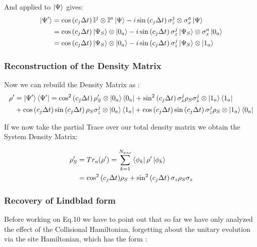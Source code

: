 \documentclass[a4paper,12pt]{article}
\begin{document}
	And applied to $ \ket{\Psi} $ gives:
	\begin{align} 
		\ket{\Psi'} &= \cos \left(c_j \Delta t \right) \mathbb{I}^j \otimes \mathbb{I}^a \ket{\Psi} - i \sin \left(c_j \Delta t \right) \sigma_{z}^{j} \otimes \sigma_{x}^{a} \ket{\Psi} \notag \\
		&= \cos \left(c_j \Delta t \right) \ket{\Psi_S} \otimes \ket{0_a} - i \sin \left(c_j \Delta t \right) \sigma_{z}^{j} \ket{\Psi_S} \otimes \sigma_{x}^{a} \ket{0_a} \notag \\
		&= \cos \left(c_j \Delta t \right) \ket{\Psi_S} \otimes \ket{0_a} - i \sin \left(c_j \Delta t \right) \sigma_{z}^{j} \ket{\Psi_S} \otimes \ket{1_a}
	\end{align}
		
	\subsubsection{Reconstruction of the Density Matrix}
	Now we can rebuild the Density Matrix as :
	\begin{align}
		\rho' &= \ket{\Psi'}\bra{\Psi'} = \cos^{2} \left(c_j \Delta t \right) \rho_S' \otimes \ket{0_a}\bra{0_a} + \sin^{2} \left(c_j \Delta t \right) \sigma_{z}^{j} \rho_S \sigma_{z}^{j} \otimes \ket{1_a}\bra{1_a} \notag \\
		&+ \cos \left(c_j \Delta t \right) \sin \left(c_j \Delta t \right) \rho_S \sigma_{z}^{j} \otimes \ket{0_a} \bra{1_a} + \cos \left(c_j \Delta t \right) \sin \left(c_j \Delta t \right) \sigma_{z}^{j} \rho_S \otimes \ket{1_a} \bra{0_a}
	\end{align}
	
	\begin{flushleft}
		If we now take the partial Trace over our total density matrix we obtain the System Density Matrix:
	\end{flushleft}
	
	\begin{align}
		\rho'_S & = Tr_a(\rho') = \sum_{k=1}^{N_{anc}}{\bra{\phi_k}\rho'\ket{\phi_k}} \notag \\
		&= \cos^{2}{\left(c_{j} \Delta t\right)} \rho_S + \sin^{2}{\left(c_{j} \Delta t\right)} \, \sigma_{z} \rho_S \sigma_{z} 
	\end{align}	
	
	\subsubsection{Recovery of Lindblad form}
	Before working on Eq.10 we have to point out that so far we have only analyzed the effect of the Collisional Hamiltonian, forgetting about the unitary evolution via the site Hamiltonian, which has the form : 
	
\end{document}
